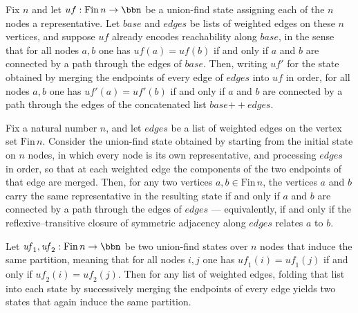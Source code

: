 \begin{lemma}
\label{Kruskal.mergeAll_iff_reach}
\leanok
{}
Fix $n$ and let $uf : \mathrm{Fin}\,n \to \bbn$ be a union-find state assigning each of
the $n$ nodes a representative. Let $\mathit{base}$ and $\mathit{edges}$ be lists of
weighted edges on these $n$ vertices, and suppose $uf$ already encodes reachability
along $\mathit{base}$, in the sense that for all nodes $a, b$ one has $uf(a) = uf(b)$ if
and only if $a$ and $b$ are connected by a path through the edges of $\mathit{base}$.
Then, writing $uf'$ for the state obtained by merging the endpoints of every edge of
$\mathit{edges}$ into $uf$ in order, for all nodes $a, b$ one has $uf'(a) = uf'(b)$ if
and only if $a$ and $b$ are connected by a path through the edges of the concatenated
list $\mathit{base} \mathbin{+\!\!+} \mathit{edges}$.
\end{lemma}

\begin{lemma}
\label{Kruskal.mergeAll_init_iff}
\leanok
{}
Fix a natural number $n$, and let $\mathit{edges}$ be a list of weighted edges on the
vertex set $\mathrm{Fin}\,n$. Consider the union-find state obtained by starting from
the initial state on $n$ nodes, in which every node is its own representative, and
processing $\mathit{edges}$ in order, so that at each weighted edge the components of
the two endpoints of that edge are merged. Then, for any two vertices $a, b \in
\mathrm{Fin}\,n$, the vertices $a$ and $b$ carry the same representative in the
resulting state if and only if $a$ and $b$ are connected by a path through the edges of
$\mathit{edges}$ — equivalently, if and only if the reflexive--transitive closure of
symmetric adjacency along $\mathit{edges}$ relates $a$ to $b$.
\end{lemma}

\begin{lemma}
\label{Kruskal.mergeAll_congr}
\leanok
{}
Let $\mathit{uf}_1, \mathit{uf}_2 : \mathrm{Fin}\,n \to \bbn$ be two union-find states
over $n$ nodes that induce the same partition, meaning that for all nodes $i, j$ one has
$\mathit{uf}_1(i) = \mathit{uf}_1(j)$ if and only if $\mathit{uf}_2(i) =
\mathit{uf}_2(j)$. Then for any list of weighted edges, folding that list into each
state by successively merging the endpoints of every edge yields two states that again
induce the same partition.
\end{lemma}


